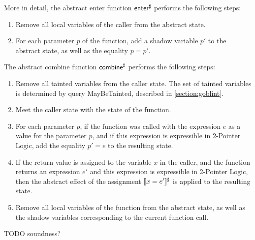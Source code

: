 More in detail, the abstract enter function $\textsf{enter}^\sharp$ performs the following steps:
\begin{enumerate}
    \item Remove all local variables of the caller from the abstract state.
    \item For each parameter $p$ of the function, add a shadow variable $p'$ to the abstract state,
as well as the equality $p = p'$.
\end{enumerate}

The abstract combine function $\textsf{combine}^\sharp$ performs the following steps:
\begin{enumerate}
    \item Remove all tainted  variables from the caller state. The set of tainted variables is determined by query \textsf{MayBeTainted}, described in \cref{section:goblint}.
    \item Meet the caller state with the state of the function.
    \item For each parameter $p$, if the function was called with the
    expression $e$ as a value for the parameter $p$, and if this expression is expressible in 2-Pointer Logic,
     add the equality $p' = e$ to the resulting state.
    \item If the return value is assigned to the variable $x$ in the caller,
    and the function returns an expression $e'$ and this expression is expressible in 2-Pointer Logic,
    then the abstract effect of the assignment $\llbracket x = e'\rrbracket^\sharp$ is applied to the resulting state.
    \item Remove all local variables of the function from the abstract state,
    as well as the shadow variables corresponding to the current function call.
\end{enumerate}
TODO soundness?

